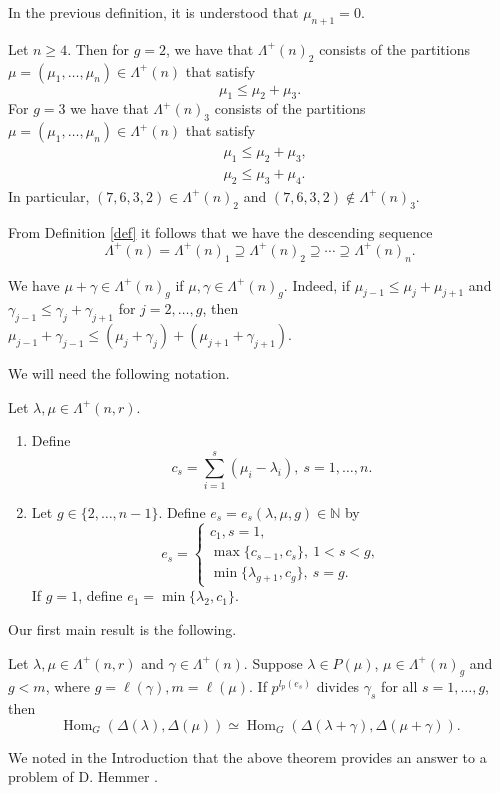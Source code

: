 \documentclass[ALCO,Unicode]{cedram}
\newcommand{\m}{\mu}
\newcommand{\la}{\lambda}
\newcommand{\La}{\Lambda}
\DeclareMathOperator{\Hom}{Hom}
\numberwithin{equation}{section}
\begin{document}
	In the previous definition, it is understood that $\mu_{n+1}=0$.
\begin{exam*}Let $n \ge4$. Then for $g=2$, we have that $\La^{+}(n)_2$ consists of the partitions $\mu=(\mu_1, \dots, \mu_n) \in \La^{+}(n)$ that satisfy \[\m_1 \le \mu_2+\mu_3. \]
For $g=3$ we have that $\La^{+}(n)_3$ consists of the partitions $\mu=(\mu_1, \dots, \mu_n) \in \La^{+}(n)$ that satisfy \begin{align*}
	&\mu_1 \le \mu_2+\mu_3,\\
	&\mu_2 \le \mu_3+\mu_4.
\end{align*}
In particular, $(7,6,3,2) \in \La^{+}(n)_2$ and $(7,6,3,2) \notin \La^{+}(n)_3$.
\end{exam*}
From Definition \ref{def} it follows that we have the descending sequence \[\Lambda^+(n) = \Lambda^+(n)_1 \supseteq \Lambda^+(n)_2 \supseteq \cdots \supseteq  \Lambda^+(n)_n . \]
\begin{rema}\label{add}	We have  $\mu + \gamma \in \Lambda^+(n)_g$ if $\mu, \gamma \in \Lambda^+(n)_g.$ Indeed, if $\mu_{j-1} \le \mu_j +\mu_{j+1}$ and $\gamma_{j-1} \le \gamma_j +\gamma_{j+1}$ for $j=2, \dots, g$, then $\mu_{j-1} +\gamma_{j-1} \le (\mu_j +\gamma_j) + (\mu_{j+1} +\gamma_{j+1}).$\end{rema}
	We will need the following notation. \begin{defi}\label{defce} Let $\la, \mu \in \La^{+}(n,r)$.  \begin{enumerate}\item Define \[c_s= \sum_{i=1}^{s}(\mu_i - \lambda_i), \ s=1,\dots,n.\] \item Let $g \in \{2,\dots,n-1\}$. Define $e_s=e_s(\lambda, \mu, g) \in \mathbb{N}$ by
	\begin{equation}\label{e}
		e_s=\begin{cases} c_1, s=1,\\
			\max\{c_{s-1},c_s\}, \ 1<s<g,\\
			\min\{\lambda_{g+1}, c_g\}, \ s=g.
	\end{cases}\end{equation}
If $g=1$, define $e_1 =\min\{\lambda_{2}, c_1\}$. \end{enumerate}\end{defi}
	Our first main result is the following.
	\begin{theo}\label{thm13}Let $\la, \mu \in \La^{+}(n,r)$ and  $\gamma \in \La^{+}(n)$. Suppose $\la \in P(\mu)$, $\mu \in \La^{+}(n)_g$ and $g<m$, where $g=\ell(\gamma), m=\ell(\mu)$. If $p^{l_p(e_s)}$ divides $\gamma_s$ for all $s=1,\dots,g$, then
	\[\Hom_G(\Delta(\la),\Delta(\mu)) \simeq \Hom_{G}(\Delta(\la+\gamma), \Delta(\mu+\gamma)).\]
			\end{theo}  
	We noted in the Introduction that the above theorem provides an answer to a problem  of D. Hemmer \cite[Problem 5.4]{Hem2}. 
	
\end{document}
